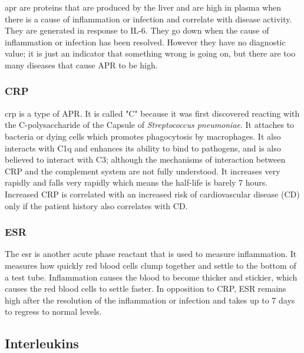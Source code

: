 \gls{apr} are proteins that are produced by the liver and are high in plasma when there is a cause of inflammation or infection and correlate with disease activity. They are generated in response to IL-6. They go down when the cause of inflammation or infection has been resolved. However they have no diagnostic value; it is just an indicator that something wrong is going on, but there are too many diseases that cause APR to be high.

\subsubsection{CRP}

\gls{crp} is a type of APR. It is called "C" because it was first discovered reacting with the C-polysaccharide of the Capsule of \textit{Streptococcus pneumoniae}. It attaches to bacteria or dying cells which promotes phagocytosis by macrophages. It also interacts with C1q and enhances its ability to bind to pathogens, and is also believed to interact with C3; although the mechanisms of interaction between CRP and the complement system are not fully understood. It increases very rapidly and falls very rapidly which means the half-life is barely 7 hours. Increased CRP is correlated with an increased risk of cardiovascular disease (CD) only if the patient history also correlates with CD.

\subsubsection{ESR}

The \gls{esr} is another acute phase reactant that is used to measure inflammation. It measures how quickly red blood cells clump together and settle to the bottom of a test tube. Inflammation causes the blood to become thicker and stickier, which causes the red blood cells to settle faster. In opposition to CRP, ESR remains high after the resolution of the inflammation or infection and takes up to 7 days to regress to normal levels.


\subsection{Interleukins}
\label{in:interleukins}



